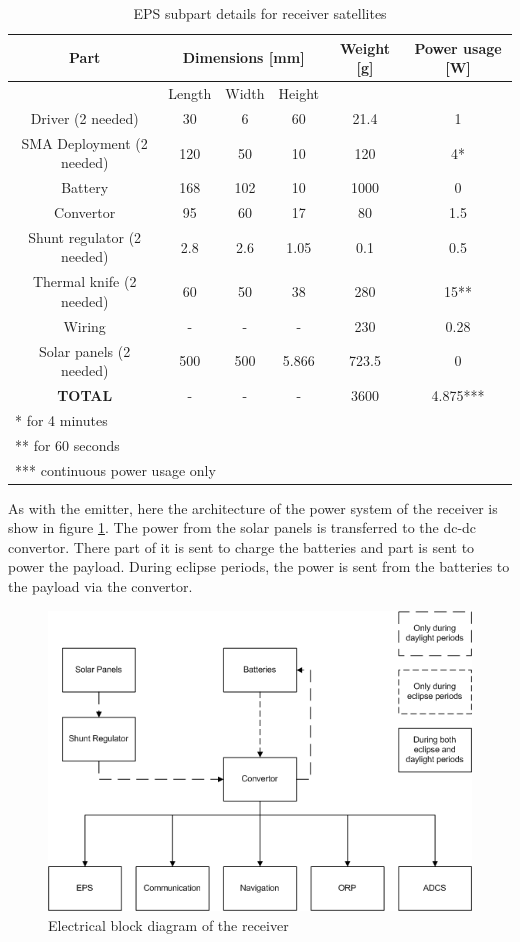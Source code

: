 \begin{table}[H!]
\centering
\begin{tabular}{cccccc}
\toprule
Part & \multicolumn{3}{c}{Dimensions [mm]} & Weight [g] & Power usage [W]\\ 
\midrule
 & Length & Width & Height & & \\ 
 Driver (2 needed) & 30 & 6 & 60 & 21.4 & 1 \\ 
 SMA Deployment (2 needed) & 120 & 50 & 10 & 120 & 4* \\ 
 Battery & 168 & 102 & 10 & 1000 & 0 \\ 
 Convertor & 95 & 60 & 17 & 80 & 1.5 \\ 
 Shunt regulator  (2 needed) & 2.8 & 2.6 & 1.05 & 0.1 & 0.5 \\ 
 Thermal knife (2 needed) & 60 & 50 & 38 & 280 & 15**  \\
 Wiring & - & - & - & 230 & 0.28 \\ 
 Solar panels (2 needed) & 500 & 500 & 5.866 & 723.5 & 0 \\
 \midrule
 \textbf{TOTAL} & - & - & - & 3600 & 4.875***  \\ 
\bottomrule
 \multicolumn{6}{l}{* for 4 minutes} \\
 \multicolumn{6}{l}{** for 60 seconds} \\
 \multicolumn{6}{l}{*** continuous power usage only} \\
\end{tabular}
\caption{EPS subpart details for receiver satellites}
\label{tab:EPS_detailsRec}
\end{table}


As with the emitter, here the architecture of the power system of the receiver is show in figure \ref{fig:receiver_block}. The power from the solar panels is transferred to the dc-dc convertor. There part of it is sent to charge the batteries and part is sent to power the payload. During eclipse periods, the power is sent from the batteries to the payload via the convertor.

\begin{figure}[H!]
\centering
\includegraphics[scale = 0.7]{chapters/img/EPS_receiver_block_diagram.png}
\caption{Electrical block diagram of the receiver}
\label{fig:receiver_block}
\end{figure}